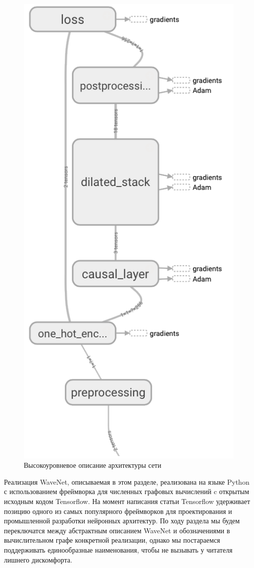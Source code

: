 \documentclass[../diploma.tex]{subfiles}
\begin{document}
\begin{figure}[!htbp]
  \centering
  \includegraphics[scale=1.1]{img/network}
  \caption{Высокоуровневое описание архитектуры сети}
  \label{fig:arch_high}
\end{figure}

Реализация WaveNet, описываемая в этом разделе, реализована на языке Python с использованием фреймворка для численных графовых вычислений c открытым исходным кодом Tensorflow. На момент написания статьи Tensorflow удерживает позицию одного из самых популярного фреймворков для проектирования и промышленной разработки нейронных архитектур.
По ходу раздела мы будем переключатся между абстрактным описанием WaveNet и обозначениями в вычислительном графе конкретной реализации, однако мы постараемся поддерживать единообразные наименования, чтобы не вызывать у читателя лишнего дискомфорта.
\end{document}

